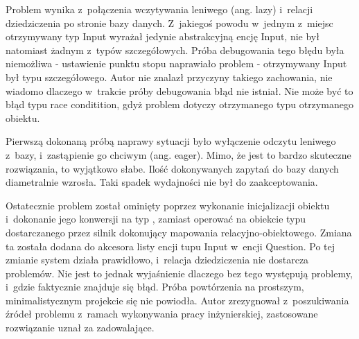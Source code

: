 \medskip
Problem wynika z~połączenia wczytywania leniwego (ang. lazy) i~relacji dziedziczenia po stronie bazy danych. Z~jakiegoś powodu w~jednym z~miejsc otrzymywany typ Input wyrażał jedynie abstrakcyjną encję Input, nie był natomiast żadnym z~typów szczegółowych. Próba debugowania tego błędu była niemożliwa - ustawienie punktu stopu naprawiało problem - otrzymywany Input był typu szczegółowego.  Autor nie znalazł przyczyny takiego zachowania, nie wiadomo dlaczego w~trakcie próby debugowania błąd nie istniał. Nie może być to błąd typu race conditition, gdyż problem dotyczy otrzymanego typu otrzymanego obiektu.

\medskip
Pierwszą dokonaną próbą naprawy sytuacji było wyłączenie odczytu leniwego z~bazy, i~zastąpienie go chciwym (ang. eager). Mimo, że jest to bardzo skuteczne rozwiązania, to wyjątkowo słabe. Ilość dokonywanych zapytań do bazy danych diametralnie wzrosła. Taki spadek wydajności nie był do zaakceptowania.

\medskip
Ostatecznie problem został ominięty poprzez wykonanie inicjalizacji obiektu i~dokonanie jego konwersji na typ , zamiast operować na obiekcie typu  dostarczanego przez silnik dokonujący mapowania relacyjno-obiektowego. Zmiana ta została dodana do akcesora listy encji tupu Input w~encji Question. Po tej zmianie system działa prawidłowo, i~relacja dziedziczenia nie dostarcza problemów. Nie jest to jednak wyjaśnienie dlaczego bez tego występują problemy, i~gdzie faktycznie znajduje się błąd. Próba powtórzenia na prostszym, minimalistycznym projekcie się nie powiodła. Autor zrezygnował z~poszukiwania źródeł problemu z~ramach wykonywania pracy inżynierskiej, zastosowane rozwiązanie uznał za zadowalające.


